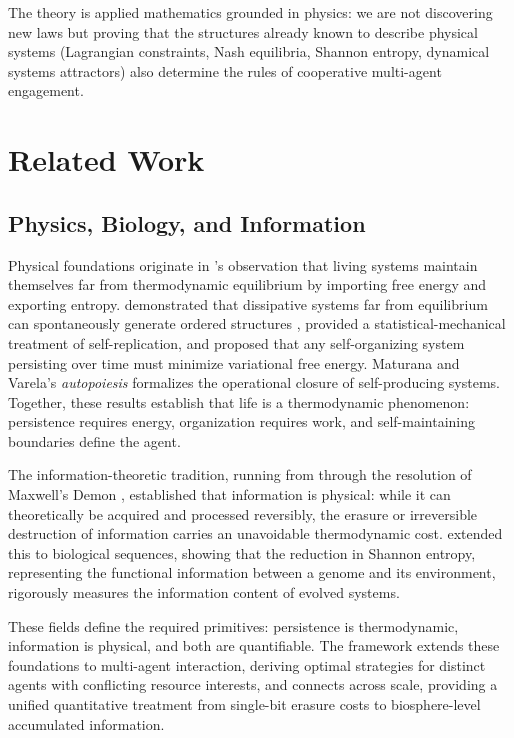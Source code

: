 \documentclass[11pt]{article}
\theoremstyle{plain}
\theoremstyle{definition}
\theoremstyle{remark}
\let\origsection\section
\renewcommand{\section}{\needspace{12\baselineskip}\origsection}
\let\origsubsection\subsection
\renewcommand{\subsection}{\needspace{7\baselineskip}\origsubsection}
\begin{document}
The theory is applied mathematics grounded in physics: we are not
discovering new laws but proving that the structures already known to
describe physical systems (Lagrangian constraints, Nash equilibria,
Shannon entropy, dynamical systems attractors) also determine the rules
of cooperative multi-agent engagement.

\section{Related Work}\label{related-work}

\subsection{Physics, Biology, and
Information}\label{physics-biology-and-information}

Physical foundations originate in \citet{Schrodinger1944}'s observation
that living systems maintain themselves far from thermodynamic
equilibrium by importing free energy and exporting entropy.
\citet{Prigogine1978} demonstrated that dissipative systems far from
equilibrium can spontaneously generate ordered structures
\citep{Nicolis1977}, \citet{England2013} provided a
statistical-mechanical treatment of self-replication, and
\citeauthor{Friston2006}
\citetext{\citeyear{Friston2006}; \citeyear{Friston2010}} proposed that
any self-organizing system persisting over time must minimize
variational free energy. Maturana and Varela's \emph{autopoiesis}
\citep{Maturana1980} formalizes the operational closure of
self-producing systems. Together, these results establish that life is a
thermodynamic phenomenon: persistence requires energy, organization
requires work, and self-maintaining boundaries define the agent.

The information-theoretic tradition, running from \citet{Shannon1948}
through the resolution of Maxwell's Demon
\citetext{\citealp{Szilard1929}; \citealp{Landauer1961}; \citealp{Bennett1973}; \citeyear{Bennett1982}},
established that information is physical: while it can theoretically be
acquired and processed reversibly, the erasure or irreversible
destruction of information carries an unavoidable thermodynamic cost.
\citet{Adami2004} extended this to biological sequences, showing that
the reduction in Shannon entropy, representing the functional
information between a genome and its environment, rigorously measures
the information content of evolved systems.

These fields define the required primitives: persistence is
thermodynamic, information is physical, and both are quantifiable. The
framework extends these foundations to multi-agent interaction, deriving
optimal strategies for distinct agents with conflicting resource
interests, and connects across scale, providing a unified quantitative
treatment from single-bit erasure costs to biosphere-level accumulated
information.
\end{document}
